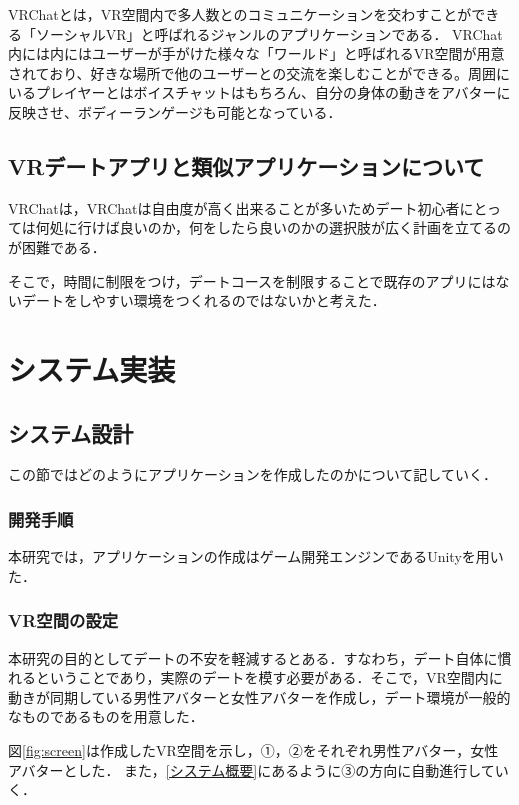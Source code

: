 \documentclass[12pt,a4j,titlepage]{ltjsarticle}
\begin{document}
VRChatとは，VR空間内で多人数とのコミュニケーションを交わすことができる「ソーシャルVR」と呼ばれるジャンルのアプリケーションである．
VRChat内には内にはユーザーが手がけた様々な「ワールド」と呼ばれるVR空間が用意されており、好きな場所で他のユーザーとの交流を楽しむことができる。周囲にいるプレイヤーとはボイスチャットはもちろん、自分の身体の動きをアバターに反映させ、ボディーランゲージも可能となっている．
\subsection{VRデートアプリと類似アプリケーションについて}
VRChatは，VRChatは自由度が高く出来ることが多いためデート初心者にとっては何処に行けば良いのか，何をしたら良いのかの選択肢が広く計画を立てるのが困難である．

そこで，時間に制限をつけ，デートコースを制限することで既存のアプリにはないデートをしやすい環境をつくれるのではないかと考えた．

\clearpage


\section{システム実装}
\subsection{システム設計}
この節ではどのようにアプリケーションを作成したのかについて記していく．
\subsubsection{開発手順}
本研究では，アプリケーションの作成はゲーム開発エンジンであるUnityを用いた．

\label{sec:0}
\subsubsection{VR空間の設定}
本研究の目的としてデートの不安を軽減するとある．すなわち，デート自体に慣れるということであり，実際のデートを模す必要がある．そこで，VR空間内に動きが同期している男性アバターと女性アバターを作成し，デート環境が一般的なものであるものを用意した．

図\ref{fig:screen}は作成したVR空間を示し，①，②をそれぞれ男性アバター，女性アバターとした．
また，\ref{システム概要}にあるように③の方向に自動進行していく．
\end{document}
